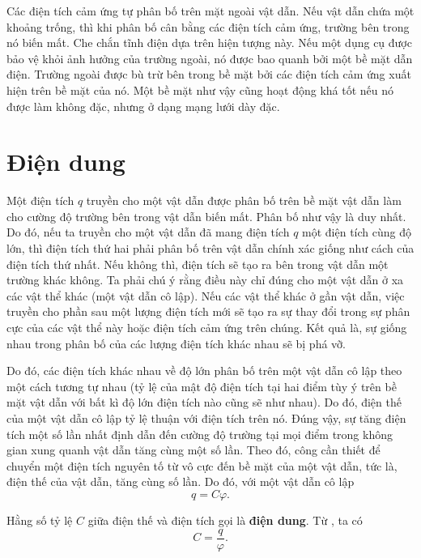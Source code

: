 Các điện tích cảm ứng tự phân bố trên mặt ngoài vật dẫn. Nếu vật dẫn chứa một khoảng trống, thì khi phân bố cân bằng các điện tích cảm ứng, trường bên trong nó biến mất. Che chắn tĩnh điện dựa trên hiện tượng này. Nếu một dụng cụ được bảo vệ khỏi ảnh hưởng của trường ngoài, nó được bao quanh bởi một bề mặt dẫn điện. Trường ngoài được bù trừ bên trong bề mặt bởi các điện tích cảm ứng xuất hiện trên bề mặt của nó. Một bề mặt như vậy cũng hoạt động khá tốt nếu nó được làm không đặc, nhưng ở dạng mạng lưới dày đặc.

\section{Điện dung}\label{sec:3_3}

Một điện tích $q$ truyền cho một vật dẫn được phân bố trên bề mặt vật dẫn làm cho cường độ trường bên trong vật dẫn biến mất. Phân bố như vậy là duy nhất. Do đó, nếu ta truyền cho một vật dẫn đã mang điện tích $q$ một điện tích cùng độ lớn, thì điện tích thứ hai phải phân bố trên vật dẫn chính xác giống như cách của điện tích thứ nhất. Nếu không thì, điện tích sẽ tạo ra bên trong vật dẫn một trường khác không. Ta phải chú ý rằng điều này chỉ đúng cho một vật dẫn ở xa các vật thể khác (một vật dẫn cô lập). Nếu các vật thể khác ở gần vật dẫn, việc truyền cho phần sau một lượng điện tích mới sẽ tạo ra sự thay đổi trong sự phân cực của các vật thể này hoặc điện tích cảm ứng trên chúng. Kết quả là, sự giống nhau trong phân bố của các lượng điện tích khác nhau sẽ bị phá vỡ.

Do đó, các điện tích khác nhau về độ lớn phân bố trên một vật dẫn cô lập theo một cách tương tự nhau (tỷ lệ của mật độ điện tích tại hai điểm tùy ý trên bề mặt vật dẫn với bất kì độ lớn điện tích nào cũng sẽ như nhau). Do đó, điện thế của một vật dẫn cô lập tỷ lệ thuận với điện tích trên nó. Đúng vậy, sự tăng điện tích một số lần nhất định dẫn đến cường độ trường tại mọi điểm trong không gian xung quanh vật dẫn tăng cùng một số lần. Theo đó, công cần thiết để chuyển một điện tích nguyên tố từ vô cực đến bề mặt của một vật dẫn, tức là, điện thế của vật dẫn, tăng cùng số lần. Do đó, với một vật dẫn cô lập
\begin{equation}\label{eq:3_4}
    q = C \varphi.
\end{equation}

\noindent
Hằng số tỷ lệ $C$ giữa điện thế và điện tích gọi là \textbf{điện dung}. Từ , ta có
\begin{equation}\label{eq:3_5}
    C = \frac{q}{\varphi}.
\end{equation}


